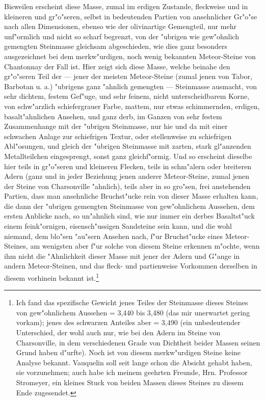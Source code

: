 \documentclass[a4paper, 11pt, oneside, german]{article}
\begin{document}
Bisweilen erscheint diese Masse, zumal im erdigen Zustande, fleckweise und in kleineren und gr"o"seren, selbst in bedeutenden Partien von ansehnlicher Gr"o"se nach allen Dimensionen, ebenso wie der olivinartige Gemengteil, nur mehr unf"ormlich und nicht so scharf begrenzt, von der "ubrigen wie gew"ohnlich gemengten Steinmasse gleichsam abgeschieden, wie dies ganz besonders ausgezeichnet bei dem merkw"urdigen, noch wenig bekannten Meteor-Steine von Chantonnay der Fall ist. Hier zeigt sich diese Masse, welche beinahe den gr"o"seren Teil der --- jener der meisten Meteor-Steine (zumal jenen von Tabor, Barbotan u. a.) "ubrigens ganz "ahnlich gemengten --- Steinmasse ausmacht, von sehr dichtem, festem Gef"uge, und sehr feinem, nicht unterscheidbarem Korne, von schw"arzlich schiefergrauer Farbe, mattem, nur etwas schimmernden, erdigen, basalt"ahnlichen Ansehen, und ganz derb, im Ganzen von sehr festem Zusammenhange mit der "ubrigen Steinmasse, nur hie und da mit einer schwachen Anlage zur schiefrigen Textur, oder stellenweise zu schiefrigen Abl"osungen, und gleich der "ubrigen Steinmasse mit zarten, stark gl"anzenden Metallteilchen eingesprengt, sonst ganz gleichf"ormig. Und so erscheint dieselbe hier teils in gr"o"seren und kleineren Flecken, teils in schm"alern oder breiteren Adern (ganz und in jeder Beziehung jenen anderer Meteor-Steine, zumal jenen der Steine von Charsonville "ahnlich), teils aber in so gro"sen, frei anstehenden Partien, dass man ansehnliche Bruchst"ucke rein von dieser Masse erhalten kann, die dann der "ubrigen gemengten Steinmasse von gew"ohnlichem Aussehen, dem ersten Anblicke nach, so un"ahnlich sind, wie nur immer ein derbes Basaltst"uck einem feink"ornigen, eisensch"ussigen Sandsteine sein kann, und die wohl niemand, dem blo"sen "au"sern Ansehen nach, f"ur Bruchst"ucke eines Meteor-Steines, am wenigsten aber f"ur solche von diesem Steine erkennen m"ochte, wenn ihm nicht die "Ahnlichkeit dieser Masse mit jener der Adern und G"ange in andern Meteor-Steinen, und das fleck- und partienweise Vorkommen derselben in diesem vorhinein bekannt ist.\footnote{Ich fand das spezifische Gewicht jenes Teiles der Steinmasse dieses Steines von gew"ohnlichem Aussehen = 3,440 bis 3,480 (das mir unerwartet gering vorkam); jenes des schwarzen Anteiles aber = 3,490 (ein unbedeutender Unterschied, der wohl auch nur, wie bei den Adern im Steine von Charsonville, in dem verschiedenen Grade von Dichtheit beider Massen seinen Grund haben d"urfte). Noch ist von diesem merkw"urdigen Steine keine Analyse bekannt. Vauquelin soll seit lange schon die Absicht gehabt haben, sie vorzunehmen; auch habe ich meinem geehrten Freunde, Hrn. Professor Stromeyer, ein kleines Stuck von beiden Massen dieses Steines zu diesem Ende zugesendet.}
\end{document}
